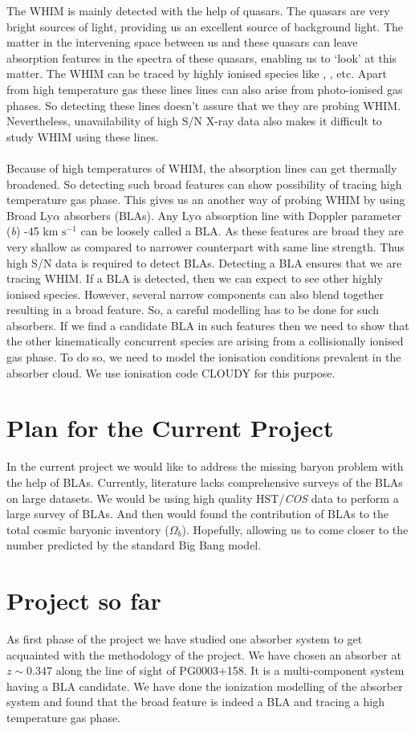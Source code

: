 \documentclass[12pt,oneside,noprintercorrection]{iut}
\newcommand\ion[2]{\text{#1\,\textsc{\lowercase{#2}}}}
\begin{document}
The WHIM is mainly detected with the help of quasars. The quasars are very bright sources of light, providing us an excellent source of background light. The matter in the intervening space between us and these quasars can leave absorption features in the spectra of these quasars, enabling us to `look' at this matter. The WHIM can be traced by highly ionised species like \ion{O}{vi-viii}, \ion{Ne}{viii}, etc. Apart from high temperature gas these lines lines can also arise from photo-ionised gas phases. So detecting these lines doesn't assure that we they are probing WHIM. Nevertheless, unavailability of high S/N X-ray data also makes it difficult to study WHIM using these lines. 
\\\\
Because of high temperatures of WHIM, the absorption lines can get thermally broadened. So detecting such broad features can show possibility of tracing high temperature gas phase. This gives us an another way of probing WHIM by using Broad Ly$\alpha$ absorbers (BLAs). Any Ly$\alpha$ absorption line with Doppler parameter (\emph{b}) -45 km $\text{s}^{-1}$ can be loosely called a BLA. As these features are broad they are very shallow as compared to narrower counterpart with same line strength. Thus high S/N data is required to detect BLAs. Detecting a BLA ensures that we are tracing WHIM. If a BLA is detected, then we can expect to see other highly ionised species. However, several narrow components can also blend together resulting in a broad feature. So, a careful modelling has to be done for such absorbers. If we find a candidate BLA in such features then we need to show that the other kinematically concurrent species are arising from a collisionally ionised gas phase. To do so, we need to model the ionisation conditions prevalent in the absorber cloud. We use ionisation code CLOUDY for this purpose.

\section*{Plan for the Current Project}

In the current project we would like to address the missing baryon problem with the help of BLAs. Currently, literature lacks comprehensive surveys of the BLAs on large datasets. We would be using high quality HST/\textit{COS} data to perform a large survey of BLAs. And then would found the contribution of BLAs to the total cosmic baryonic inventory ($\Omega_b$). Hopefully, allowing us to come closer to the number predicted by the standard Big Bang model.  

\section*{Project so far}

As first phase of the project we have studied one absorber system to get acquainted with the methodology of the project. We have chosen an absorber at $z\sim0.347$ along the line of sight of PG0003+158. It is a multi-component system having a BLA candidate. We have done the ionization modelling of the absorber system and found that the broad feature is indeed a BLA and tracing a high temperature gas phase.
\end{document}
